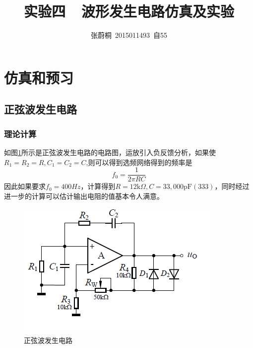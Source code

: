 \documentclass[UTF8,a4paper]{paper}
\title{实验四\ \ 波形发生电路仿真及实验}
\author{张蔚桐\ 2015011493\ 自55}
\begin{document}
\maketitle
\section{仿真和预习}
\subsection{正弦波发生电路}
\subsubsection{理论计算}
\begin{multicols}{2}
如图\ref{ACCirc}所示是正弦波发生电路的电路图，运放引入负反馈分析，如果使$R_1=R_2=R,C_1=C_2=C$,则可以得到选频网络得到的频率是
$$f_0=\frac{1}{2\pi RC}$$
因此如果要求$f_0=400Hz$，计算得到$R=12\mathrm{k}\Omega,C=33,000\mathrm{pF}(333)$，同时经过进一步的计算可以估计输出电阻的值基本令人满意。
\begin {figure}[H]
\includegraphics [width=\columnwidth]{ac.png}
\caption{正弦波发生电路}
\label{ACCirc}
\end {figure}
\end{multicols}
\end{document}
